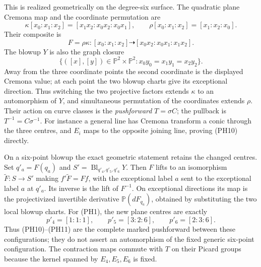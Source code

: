 This is realized geometrically on the degree-six surface. The quadratic
plane Cremona map and the coordinate permutation are
\[
 \kappa[x_0:x_1:x_2]=[x_1x_2:x_0x_2:x_0x_1],\qquad
 \rho[x_0:x_1:x_2]=[x_1:x_2:x_0].
\]
Their composite is
\[
 F=\rho\kappa:[x_0:x_1:x_2]\dashrightarrow
 [x_0x_2:x_0x_1:x_1x_2].                                       \tag{PH12}
\]
The blowup $Y$ is also the graph closure
\[
 \{([x],[y])\in\mathbb P^2\times\mathbb P^2:
                 x_0y_0=x_1y_1=x_2y_2\}.
\]
Away from the three coordinate points the second coordinate is the
displayed Cremona value; at each point the two blowup charts give its
exceptional direction. Thus switching the two projective factors extends
$\kappa$ to an automorphism of $Y$, and simultaneous permutation of the
coordinates extends $\rho$. Their action on curve classes is the
\emph{pushforward} $T=\sigma C$; the pullback is $T^{-1}=C\sigma^{-1}$.
For instance a general line has Cremona transform a conic through the three
centres, and $E_i$ maps to the opposite joining line, proving (PH10) directly.

On a six-point blowup the exact geometric statement retains the changed
centres. Set $q'_a=F(q_a)$ and
$S'=\operatorname{Bl}_{q'_4,q'_5,q'_6}Y$. Then $F$ lifts to an isomorphism
$\widetilde F:S\to S'$ making $f'\widetilde F=Ff$, with the exceptional
label $a$ sent to the exceptional label $a$ at $q'_a$. Its inverse is the
lift of $F^{-1}$. On exceptional directions its map is the projectivized
invertible derivative $\mathbb P(dF_{q_a})$, obtained by substituting the
two local blowup charts. For (PH1), the new plane centres are exactly
\[
 p'_4=[1:1:1],\qquad p'_5=[3:2:6],\qquad p'_6=[2:3:6].
\]
Thus (PH10)--(PH11) are the complete marked pushforward between these
configurations; they do not assert an automorphism of the fixed generic
six-point configuration. The contraction maps commute with $T$ on their
Picard groups because the kernel spanned by $E_4,E_5,E_6$ is fixed.

